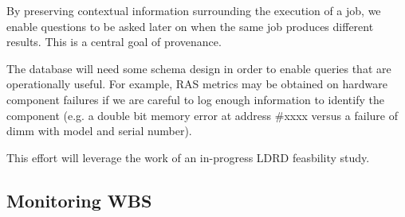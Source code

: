 By preserving contextual information surrounding the execution of a job,
we enable questions to be asked later on when the same job produces
different results.  This is a central goal of provenance.

The database will need some schema design in order to enable queries
that are operationally useful.  For example, RAS metrics may be obtained
on hardware component failures if we are careful to log enough information
to identify the component (e.g. a double bit memory error at address \#xxxx
versus a failure of dimm with model and serial number).

This effort will leverage the work of an in-progress LDRD
feasbility study\cite{LogLDRD}.

\subsection{Monitoring WBS}

